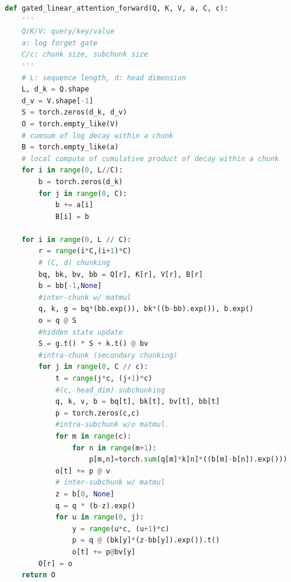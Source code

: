  
 
\lstset{style=mystyle}

\lstset{language=Python, basicstyle=\ttfamily\footnotesize}
%
\begin{lstlisting}[language=Python, caption=Pytorch-like code snippet of our two-level chunking algorithm for training GLA.  We omit the dimensions of batch size and number of heads for clarity, label=a, numbers=none]
def gated_linear_attention_forward(Q, K, V, a, C, c):
    '''
    Q/K/V: query/key/value 
    a: log forget gate 
    C/c: chunk size, subchunk size
    '''
    # L: sequence length, d: head dimension
    L, d_k = Q.shape
    d_v = V.shape[-1]
    S = torch.zeros(d_k, d_v)
    O = torch.empty_like(V)
    # cumsum of log decay within a chunk
    B = torch.empty_like(a)
    # local compute of cumulative product of decay within a chunk
    for i in range(0, L//C):
        b = torch.zeros(d_k)
        for j in range(0, C):
            b += a[i]
            B[i] = b

    for i in range(0, L // C):
        r = range(i*C,(i+1)*C) 
        # (C, d) chunking
        bq, bk, bv, bb = Q[r], K[r], V[r], B[r] 
        b = bb[-1,None]
        #inter-chunk w/ matmul
        q, k, g = bq*(bb.exp()), bk*((b-bb).exp()), b.exp()
        o = q @ S
        #hidden state update
        S = g.t() * S + k.t() @ bv 
        #intra-chunk (secondary chunking)
        for j in range(0, C // c):
            t = range(j*c, (j+1)*c)
            #(c, head_dim) subchunking
            q, k, v, b = bq[t], bk[t], bv[t], bb[t] 
            p = torch.zeros(c,c)
            #intra-subchunk w/o matmul. 
            for m in range(c):
                for n in range(m+1):
                    p[m,n]=torch.sum(q[m]*k[n]*((b[m]-b[n]).exp()))
            o[t] += p @ v
            # inter-subchunk w/ matmul    
            z = b[0, None]
            q = q * (b-z).exp()
            for u in range(0, j):
                y = range(u*c, (u+1)*c) 
                p = q @ (bk[y]*(z-bb[y]).exp()).t()
                o[t] += p@bv[y]
        O[r] = o
    return O
\end{lstlisting}

%
%


%

%
%
%
%

